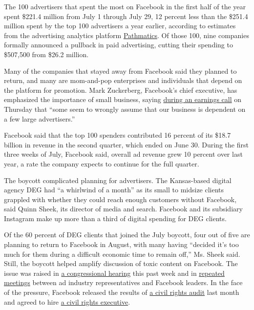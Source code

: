 The 100 advertisers that spent the most on Facebook in the first half of
the year spent \$221.4 million from July 1 through July 29, 12 percent
less than the \$251.4 million spent by the top 100 advertisers a year
earlier, according to estimates from the advertising analytics platform
\href{https://www.pathmatics.com/product/methodology}{Pathmatics}. Of
those 100, nine companies formally announced a pullback in paid
advertising, cutting their spending to \$507,500 from \$26.2 million.

Many of the companies that stayed away from Facebook said they planned
to return, and many are mom-and-pop enterprises and individuals that
depend on the platform for promotion. Mark Zuckerberg, Facebook's chief
executive, has emphasized the importance of small business, saying
\href{https://www.nytimes3xbfgragh.onion/live/2020/07/30/business/stock-market-today-coronavirus\#facebook-nearly-doubles-its-profit-but-warns-of-fallout-from-ad-boycottshttps://www.nytimes3xbfgragh.onion/2020/07/30/technology/tech-company-earnings-amazon-apple-facebook-google.html}{during
an earnings call} on Thursday that ``some seem to wrongly assume that
our business is dependent on a few large advertisers.''

Facebook said that the top 100 spenders contributed 16 percent of its
\$18.7 billion in revenue in the second quarter, which ended on June 30.
During the first three weeks of July, Facebook said, overall ad revenue
grew 10 percent over last year, a rate the company expects to continue
for the full quarter.

The boycott complicated planning for advertisers. The Kansas-based
digital agency DEG had ``a whirlwind of a month'' as its small to
midsize clients grappled with whether they could reach enough customers
without Facebook, said Quinn Sheek, its director of media and search.
Facebook and its subsidiary Instagram make up more than a third of
digital spending for DEG clients.

Of the 60 percent of DEG clients that joined the July boycott, four out
of five are planning to return to Facebook in August, with many having
``decided it's too much for them during a difficult economic time to
remain off,'' Ms. Sheek said. Still, the boycott helped amplify
discussion of toxic content on Facebook. The issue was raised in
\href{https://www.nytimes3xbfgragh.onion/2020/07/29/technology/big-tech-hearing-apple-amazon-facebook-google.html}{a
congressional hearing} this past week and in
\href{https://www.nytimes3xbfgragh.onion/2020/06/23/business/media/facebook-ad-boycott.html}{repeated
meetings} between ad industry representatives and Facebook leaders. In
the face of the pressure, Facebook released the results of
\href{https://www.nytimes3xbfgragh.onion/2020/07/08/technology/facebook-civil-rights-audit.html}{a
civil rights audit} last month and agreed to hire
\href{https://www.nytimes3xbfgragh.onion/2020/07/07/technology/facebook-ad-boycott-civil-rights.html}{a
civil rights executive}.

